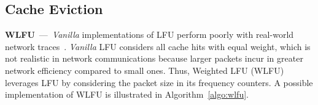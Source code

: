 \subsection{Cache Eviction}\label{sec:evi}

\textbf{WLFU}~---~\textit{Vanilla} implementations of LFU perform poorly with real-world network traces~\cite{Kim:09}.
\textit{Vanilla} LFU considers all cache hits with equal weight, which is not realistic in network communications because larger packets incur in greater network efficiency compared to small ones.
Thus, Weighted LFU (WLFU) leverages LFU by considering the packet size in its frequency counters.
A possible implementation of WLFU is illustrated in Algorithm~\ref{algo:wlfu}.

